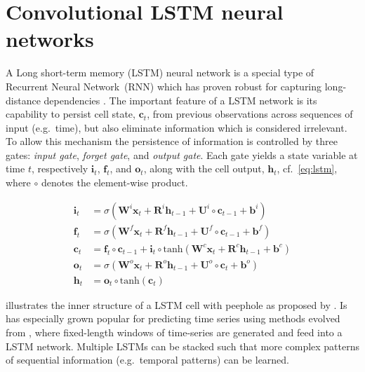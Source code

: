 ﻿\documentclass[preprint,11pt,5p,twocolumn]{elsarticle}
\newcommand{\matr}[1]{\mathbf{#1}}
\begin{document}
\section{Convolutional LSTM neural networks}
\label{sec:convlstm}
A Long short-term memory (LSTM) neural network is a special type of Recurrent Neural Network~(RNN) which has proven robust for capturing long-distance dependencies \cite{Lstm1,Lstm2}. The important feature of a LSTM network is its capability to persist cell state, $\matr{c}_t$, from previous observations across sequences of input (e.g.\ time), but also eliminate information which is considered irrelevant. To allow this mechanism the persistence of information is controlled by three gates: \emph{input gate}, \emph{forget gate}, and \emph{output gate}. Each gate yields a state variable at time $t$, respectively $\matr{i}_t$, $\matr{f}_t$, and $\matr{o}_t$, along with the cell output, $\matr{h}_t$, cf.~\cref{eq:lstm}, where $\circ$ denotes the element-wise product.

\begin{equation}
\begin{aligned}
  \matr{i}_t &= \sigma \left( \matr{W}^i \matr{x}_t + \matr{R}^i \matr{h}_{t-1} + \matr{U}^i \circ \matr{c}_{t-1} + \matr{b}^i \right) \\
  \matr{f}_t &= \sigma \left( \matr{W}^f \matr{x}_t + \matr{R}^f \matr{h}_{t-1} + \matr{U}^f \circ \matr{c}_{t-1} + \matr{b}^f \right) \\
  \matr{c}_t &= \matr{f}_t \circ \matr{c}_{t-1} + \matr{i}_t \circ \mathrm{tanh} \left( \matr{W}^c \matr{x}_t + \matr{R}^c \matr{h}_{t-1} + \matr{b}^c \right) \\
  \matr{o}_t &= \sigma \left( \matr{W}^\mathit{o} \matr{x}_t + \matr{R}^\mathit{o} \matr{h}_{t-1} + \matr{U}^\mathit{o} \circ \matr{c}_{t} + \matr{b}^o \right) \\
  \matr{h}_t &= \matr{o}_t \circ \mathrm{tanh} \left( \matr{c}_t \right)
\end{aligned}
\label{eq:lstm}
\end{equation}
\vspace{.5em}

 illustrates the inner structure of a LSTM cell with peephole as proposed by \cite{LstmPeephole}. 
Is has especially grown popular for predicting time series using methods evolved from \cite{LstmTs}, where fixed-length windows of time-series are generated and feed into a LSTM network. Multiple LSTMs can be stacked such that more complex patterns of sequential information (e.g.\ temporal patterns) can be learned.
\end{document}
